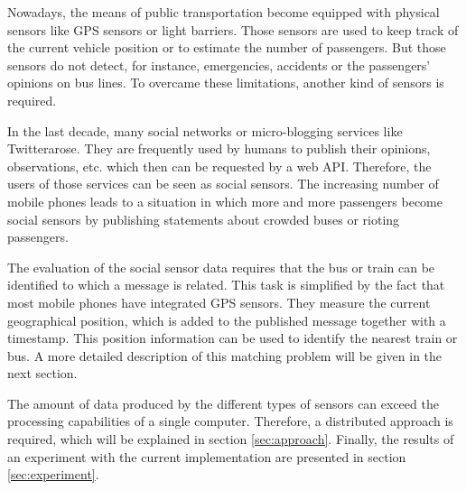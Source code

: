 


Nowadays, the means of public transportation become equipped with physical sensors like GPS sensors or light barriers. Those sensors are used to keep track of the current vehicle position or to estimate the number of passengers. But those sensors do not detect, for instance, emergencies, accidents or the passengers' opinions on bus lines. To overcame these limitations, another kind of sensors is required.

In the last decade, many social networks or micro-blogging services like Twitter\texttrademark arose. They are frequently used by humans to publish their opinions, observations, etc. which then can be requested by a web API. Therefore, the users of those services can be seen as social sensors. The increasing number of mobile phones leads to a situation in which more and more passengers become social sensors by publishing statements about crowded buses or rioting passengers.

The evaluation of the social sensor data requires that the bus or train can be identified to which a message is related. This task is simplified by the fact that most mobile phones have integrated GPS sensors. They measure the current geographical position, which is added to the published message together with a timestamp. This position information can be used to identify the nearest train or bus. A more detailed description of this matching problem  will be given in the next section.

The amount of data produced by the different types of sensors can exceed the processing capabilities of a single computer. Therefore, a distributed approach is required, which will be explained in section \ref{sec:approach}. Finally, the results of an experiment with the current implementation are presented in section \ref{sec:experiment}.

